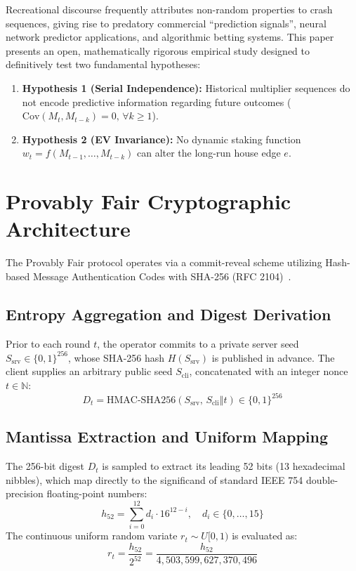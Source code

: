 \documentclass[10pt,journal,compsoc,twocolumn]{article}
\begin{document}
Recreational discourse frequently attributes non-random properties to crash sequences, giving rise to predatory commercial ``prediction signals'', neural network predictor applications, and algorithmic betting systems. This paper presents an open, mathematically rigorous empirical study designed to definitively test two fundamental hypotheses:
\begin{enumerate}
    \item \textbf{Hypothesis 1 (Serial Independence):} Historical multiplier sequences do not encode predictive information regarding future outcomes ($\text{Cov}(M_t, M_{t-k}) = 0, \, \forall k \ge 1$).
    \item \textbf{Hypothesis 2 (EV Invariance):} No dynamic staking function $w_t = f(M_{t-1}, \dots, M_{t-k})$ can alter the long-run house edge $e$.
\end{enumerate}

\section{Provably Fair Cryptographic Architecture}
The Provably Fair protocol operates via a commit-reveal scheme utilizing Hash-based Message Authentication Codes with SHA-256 (RFC 2104)~\cite{krawczyk1997hmac}.

\subsection{Entropy Aggregation and Digest Derivation}
Prior to each round $t$, the operator commits to a private server seed $S_{\text{srv}} \in \{0, 1\}^{256}$, whose SHA-256 hash $H(S_{\text{srv}})$ is published in advance. The client supplies an arbitrary public seed $S_{\text{cli}}$, concatenated with an integer nonce $t \in \mathbb{N}$:
\begin{equation}
    D_t = \text{HMAC-SHA256}\left(S_{\text{srv}}, \, S_{\text{cli}} \mathbin{\Vert} t\right) \in \{0, 1\}^{256}
\end{equation}

\subsection{Mantissa Extraction and Uniform Mapping}
The 256-bit digest $D_t$ is sampled to extract its leading 52 bits (13 hexadecimal nibbles), which map directly to the significand of standard IEEE 754 double-precision floating-point numbers:
\begin{equation}
    h_{52} = \sum_{i=0}^{12} d_i \cdot 16^{12-i}, \quad d_i \in \{0, \dots, 15\}
\end{equation}
The continuous uniform random variate $r_t \sim U[0, 1)$ is evaluated as:
\begin{equation}
    r_t = \frac{h_{52}}{2^{52}} = \frac{h_{52}}{4{,}503{,}599{,}627{,}370{,}496}
\end{equation}
\end{document}
